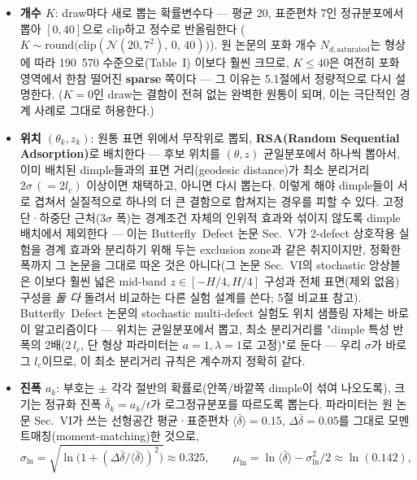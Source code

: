 \documentclass[11pt]{article}
\begin{document}
\begin{itemize}
\item \textbf{개수 $K$}: draw마다 새로 뽑는 확률변수다 --- 평균 20, 표준편차
      7인 정규분포에서 뽑아 $[0,40]$으로 clip하고 정수로 반올림한다
      ($K \sim \mathrm{round}\big(\mathrm{clip}(\mathcal{N}(20,7^2),\,0,\,40)\big)$).
      원 논문의 포화 개수 $N_{d,\text{saturated}}$는 형상에 따라 190~570
      수준으로(Table~I) 이보다 훨씬 크므로, $K\le40$은 여전히 포화 영역에서
      한참 떨어진 \textbf{sparse} 쪽이다 --- 그 이유는 5.1절에서 정량적으로
      다시 설명한다. ($K{=}0$인 draw는 결함이 전혀 없는 완벽한 원통이 되며,
      이는 극단적인 경계 사례로 그대로 허용한다.)
\item \textbf{위치 $(\theta_k, z_k)$}: 원통 표면 위에서 무작위로 뽑되,
      \textbf{RSA(Random Sequential Adsorption)}로 배치한다 --- 후보 위치를
      $(\theta,z)$ 균일분포에서 하나씩 뽑아서, 이미 배치된 dimple들과의 표면
      거리(geodesic distance)가 최소 분리거리 $2\sigma \,(=2l_c)$ 이상이면
      채택하고, 아니면 다시 뽑는다. 이렇게 해야 dimple들이 서로 겹쳐서 실질적으로
      하나의 더 큰 결함으로 합쳐지는 경우를 피할 수 있다. 고정단·하중단
      근처($3\sigma$ 폭)는 경계조건 자체의 인위적 효과와 섞이지 않도록 dimple
      배치에서 제외한다 --- 이는 Butterfly~Defect 논문 Sec.~V가 2-defect 상호작용
      실험을 경계 효과와 분리하기 위해 두는 exclusion zone과 같은 취지이지만,
      정확한 폭까지 그 논문을 그대로 따온 것은 아니다(그 논문 Sec.~VI의
      stochastic 앙상블은 이보다 훨씬 넓은 mid-band $z\in[-H/4,H/4]$ 구성과
      전체 표면(제외 없음) 구성을 \emph{둘 다} 돌려서 비교하는 다른 실험
      설계를 쓴다; 5절 비교표 참고). Butterfly~Defect 논문의 stochastic
      multi-defect 실험도 위치 샘플링 자체는 바로 이 알고리즘이다 --- 위치는
      균일분포에서 뽑고, 최소 분리거리를 "dimple 특성 반폭의 2배($2\,l_c$, 단
      형상 파라미터는 $a{=}1,\lambda{=}1$로 고정)"로 둔다 --- 우리 $\sigma$가
      바로 그 $l_c$이므로, 이 최소 분리거리 규칙은 계수까지 정확히 같다.
\item \textbf{진폭 $a_k$}: 부호는 $\pm$ 각각 절반의 확률로(안쪽/바깥쪽 dimple이
      섞여 나오도록), 크기는 정규화 진폭 $\bar\delta_k = a_k/t$가 로그정규분포를
      따르도록 뽑는다. 파라미터는 원 논문 Sec.~VI가 쓰는 선형공간 평균·표준편차
      $\langle\bar\delta\rangle{=}0.15$, $\Delta\bar\delta{=}0.05$를 그대로
      모멘트매칭(moment-matching)한 것으로,
      \[
        \sigma_{\ln} = \sqrt{\ln\!\Big(1+(\Delta\bar\delta/\langle\bar\delta\rangle)^2\Big)} \approx 0.325,
        \qquad
        \mu_{\ln} = \ln\langle\bar\delta\rangle - \sigma_{\ln}^2/2 \approx \ln(0.142),
\]
\end{itemize}
\end{document}
